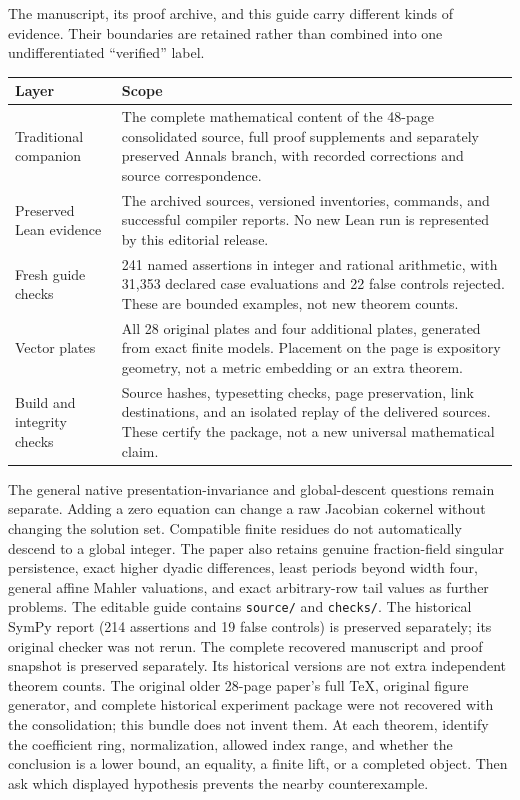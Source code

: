 The manuscript, its proof archive, and this guide carry different kinds of evidence. Their boundaries are retained rather than combined into one undifferentiated ``verified'' label.
\par
\begin{tabularx}{\linewidth}{@{}lY@{}}\toprule
Layer & Scope\\\midrule
Traditional companion & The complete mathematical content of the 48-page consolidated source, full proof supplements and separately preserved Annals branch, with recorded corrections and source correspondence.\\
Preserved Lean evidence & The archived sources, versioned inventories, commands, and successful compiler reports. No new Lean run is represented by this editorial release.\\
Fresh guide checks & 241 named assertions in integer and rational arithmetic, with 31,353 declared case evaluations and 22 false controls rejected. These are bounded examples, not new theorem counts.\\
Vector plates & All 28 original plates and four additional plates, generated from exact finite models. Placement on the page is expository geometry, not a metric embedding or an extra theorem.\\
Build and integrity checks & Source hashes, typesetting checks, page preservation, link destinations, and an isolated replay of the delivered sources. These certify the package, not a new universal mathematical claim.\\\bottomrule
\end{tabularx}
\par
{}
The general native presentation-invariance and global-descent questions remain separate. Adding a zero equation can change a raw Jacobian cokernel without changing the solution set. Compatible finite residues do not automatically descend to a global integer. The paper also retains genuine fraction-field singular persistence, exact higher dyadic differences, least periods beyond width four, general affine Mahler valuations, and exact arbitrary-row tail values as further problems.
The editable guide contains \texttt{source/} and \texttt{checks/}. The historical SymPy report (214 assertions and 19 false controls) is preserved separately; its original checker was not rerun. The complete recovered manuscript and proof snapshot is preserved separately. Its historical versions are not extra independent theorem counts. The original older 28-page paper's full TeX, original figure generator, and complete historical experiment package were not recovered with the consolidation; this bundle does not invent them.
At each theorem, identify the coefficient ring, normalization, allowed index range, and whether the conclusion is a lower bound, an equality, a finite lift, or a completed object. Then ask which displayed hypothesis prevents the nearby counterexample.
